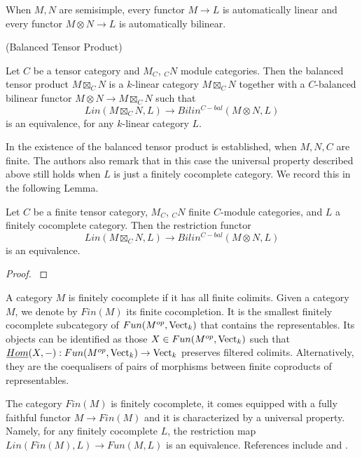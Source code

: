 \begin{remark}
When $M,N$ are semisimple, every functor $M\to L$ is automatically linear and every functor $M\otimes N\to L$ is automatically bilinear. \end{remark}

\begin{definition} (Balanced Tensor Product)

  \noindent Let $C$ be a tensor category and $M_C$, $_{C}N$ module categories. \quad Then the balanced tensor product $M \boxtimes_{C} N$ is a $k$-linear category $M\boxtimes_{C} N$ together with a $C$-balanced bilinear functor $M\otimes N\to M\boxtimes_{C} N$ such that \[Lin(M \boxtimes_{C} N, L) \to Bilin^{C-bal}(M \otimes N, L)\] is an equivalence, for any $k$-linear category $L$.\end{definition}

In \cite{douglas/balanced-product} the existence of the balanced tensor product is established, when $M,N,C$ are finite. The authors also remark that in this case the universal property described above still holds when $L$ is just a finitely cocomplete category. We record this in the following Lemma.

\begin{lemma}\label{univ_box}

Let $C$ be a finite tensor category, $M_C$, $_{C}N$ finite $C$-module categories, and $L$ a finitely cocomplete category. Then the restriction functor \[Lin(M \boxtimes_{C} N, L) \to Bilin^{C-bal}(M \otimes N, L)\] is an equivalence.\end{lemma}
\begin{proof}\cite[Remark 3.4]{douglas/balanced-product}\end{proof}

\begin{definition}

A category $M$ is finitely cocomplete if it has all finite colimits. Given a category $M$, we denote by $Fin(M)$ its finite cocompletion. It is the smallest finitely cocomplete subcategory of $Fun(M^{op},\operatorname{Vect}_k)$ that contains the representables. Its objects can be identified as those $X\in Fun(M^{op},\operatorname{Vect}_k)$ such that $\underline{Hom}(X,-):Fun(M^{op},\operatorname{Vect}_k)\to \operatorname{Vect}_k$ preserves filtered colimits. Alternatively, they are the coequalisers of pairs of morphisms between finite coproducts of representables.

The category $Fin(M)$ is finitely cocomplete, it comes equipped with a fully faithful functor $M\to Fin(M)$ and it is characterized by a universal property. Namely, for any finitely cocomplete $L$, the restriction map $Lin(Fin(M),L)\to Fun(M,L)$ is an equivalence. References include \cite[Section 5.7]{kelly/basic-concepts-enriched} and \cite[Section 2.2.1]{lopezfranco/tensor-products}.\end{definition}

